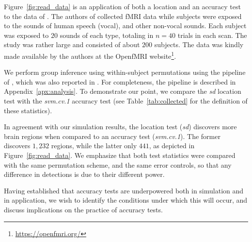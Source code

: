 \documentclass[12pt,a4paper]{article}
\begin{document}
Figure~\ref{fig:read_data} is an application of both a location and an accuracy test to the data of \cite{pernet_human_2015}. 
The authors of \cite{pernet_human_2015} collected fMRI data while subjects were exposed to the sounds of human speech (vocal), and other non-vocal sounds. 
Each subject was exposed to $20$ sounds of each type, totaling in $n=40$ trials in each scan.
The study was rather large and consisted of about $200$ subjects.
The data was kindly made available by the authors at the OpenfMRI website\footnote{\url{https://openfmri.org/}}.

We perform group inference using within-subject permutations using the pipeline of \cite{stelzer_statistical_2013}, which was also reported in \cite{gilron_quantifying_2016}. 
For completeness, the pipeline is described in Appendix~\ref{apx:analysis}. 
To demonstrate our point, we compare the \emph{sd} location test with the \emph{svm.cv.1} accuracy test (see Table~\ref{tab:collected} for the definition of these statistics). 

In agreement with our simulation results, the location test (\emph{sd}) discovers more brain regions when compared to an accuracy test (\emph{svm.cv.1}).
The former discovers $1,232$ regions, while the latter only $441$, as depicted in Figure~\ref{fig:read_data}.
We emphasize that both test statistics were compared with the same permutation scheme, and the same error controls, so that any difference in detections is due to their different power.

Having established that accuracy tests are underpowered both in simulation and in application, we wish to identify the conditions under which this will occur, and discuss implications on the practice of accuracy tests. 
\end{document}

